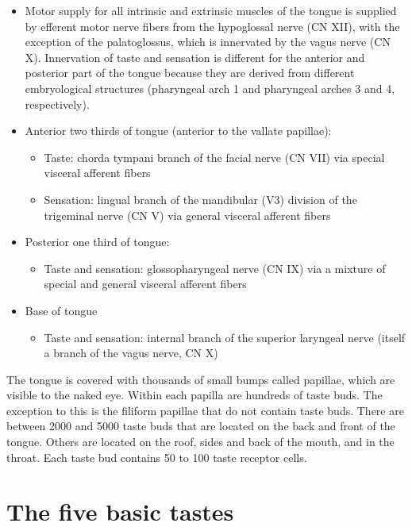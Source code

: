 \begin{itemize}
\item
  Motor supply for all intrinsic and extrinsic muscles of the tongue is supplied by efferent motor nerve fibers from the hypoglossal nerve (CN XII), with the exception of the palatoglossus, which is innervated by the vagus nerve (CN X).
  Innervation of taste and sensation is different for the anterior and posterior part of the tongue because they are derived from different embryological structures (pharyngeal arch 1 and pharyngeal arches 3 and 4, respectively).
\item
  Anterior two thirds of tongue (anterior to the vallate papillae):

  \begin{itemize}
  \tightlist
  \item
    Taste: chorda tympani branch of the facial nerve (CN VII) via special visceral afferent fibers
  \item
    Sensation: lingual branch of the mandibular (V3) division of the trigeminal nerve (CN V) via general visceral afferent fibers
  \end{itemize}
\item
  Posterior one third of tongue:

  \begin{itemize}
  \tightlist
  \item
    Taste and sensation: glossopharyngeal nerve (CN IX) via a mixture of special and general visceral afferent fibers
  \end{itemize}
\item
  Base of tongue

  \begin{itemize}
  \tightlist
  \item
    Taste and sensation: internal branch of the superior laryngeal nerve (itself a branch of the vagus nerve, CN X)
  \end{itemize}
\end{itemize}

The tongue is covered with thousands of small bumps called papillae, which are visible to the naked eye. Within each papilla are hundreds of taste buds. The exception to this is the filiform papillae that do not contain taste buds. There are between 2000 and 5000 taste buds that are located on the back and front of the tongue. Others are located on the roof, sides and back of the mouth, and in the throat. Each taste bud contains 50 to 100 taste receptor cells.

\hypertarget{the-five-basic-tastes}{%
\section{The five basic tastes}\label{the-five-basic-tastes}}

